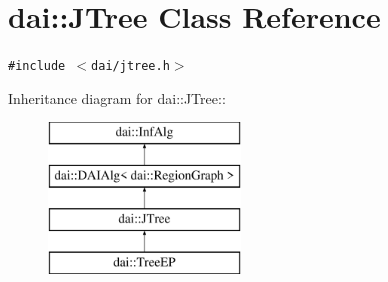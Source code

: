 \hypertarget{classdai_1_1JTree}{
\section{dai::JTree Class Reference}
\label{classdai_1_1JTree}
}
{\tt \#include $<$dai/jtree.h$>$}

Inheritance diagram for dai::JTree::\begin{figure}[H]
\begin{center}
\leavevmode
\includegraphics[height=4cm]{classdai_1_1JTree}
\end{center}
\end{figure}



